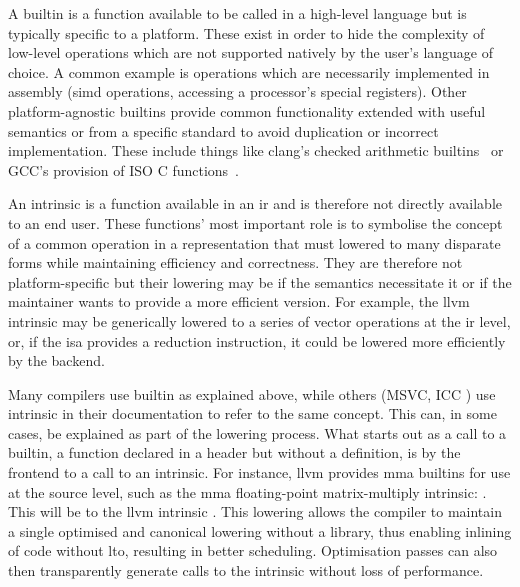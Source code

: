 \documentclass[\main/thesis.tex]{subfiles}
\begin{document}
A \gls{builtin} is a function available to be called in a high-level language but is typically specific to a platform.
These exist in order to hide the complexity of low-level operations which are not supported natively by the user's language of choice.
A common example is operations which are necessarily implemented in assembly (\eg \gls{simd} operations, accessing a processor's special registers).
Other platform-agnostic \glspl{builtin} provide common functionality extended with useful semantics or from a specific standard to avoid duplication or incorrect implementation.
These include things like \gls{clang}'s checked arithmetic builtins~\autocite{llvmCheckArith} or GCC's provision of ISO C functions~\autocite{gccOtherBuiltins}.

An \gls{intrinsic} is a function available in an \gls{ir} and is therefore not directly available to an end user.
These functions' most important role is to symbolise the concept of a common operation in a representation that must lowered to many disparate forms while maintaining efficiency and correctness.
They are therefore not platform-specific but their lowering may be if the semantics necessitate it or if the maintainer wants to provide a more efficient version.
For example, the \gls{llvm} \gls{intrinsic}  may be generically lowered to a series of vector operations at the \gls{ir} level, or, if the \gls{isa} provides a reduction instruction, it could be lowered more efficiently by the backend.

Many compilers use \gls{builtin} as explained above, while others (\eg MSVC, ICC  ) use \gls{intrinsic} in their documentation to refer to the same concept.
This can, in some cases, be explained as part of the lowering process.
What starts out as a call to a \gls{builtin}, a function declared in a header but without a definition, is  by the frontend to a call to an intrinsic.
For instance, \gls{llvm} provides \gls{mma} \glspl{builtin} for use at the source level, such as the \gls{mma} floating-point matrix-multiply intrinsic: .
This will be  to the \gls{llvm} \gls{intrinsic} .
This \gls{lowering} allows the compiler to maintain a single optimised and canonical lowering without a library, thus enabling inlining of code without \gls{lto}, resulting in better scheduling.
Optimisation passes can also then transparently generate calls to the intrinsic without loss of performance.
\end{document}
